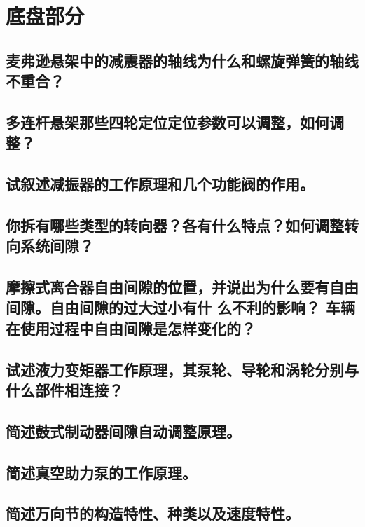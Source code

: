 \documentclass[UTF8]{ctexart}
\numberwithin{figure}{section}
\numberwithin{table}{section}
\begin{document}
\section{底盘部分}
\subsection{麦弗逊悬架中的减震器的轴线为什么和螺旋弹簧的轴线不重合？}
\subsection{多连杆悬架那些四轮定位定位参数可以调整，如何调整？}
\subsection{试叙述减振器的工作原理和几个功能阀的作用。}
\subsection{你拆有哪些类型的转向器？各有什么特点？如何调整转向系统间隙？}
\subsection{摩擦式离合器自由间隙的位置，并说出为什么要有自由间隙。自由间隙的过大过小有什
	么不利的影响？ 车辆在使用过程中自由间隙是怎样变化的？}
\subsection{试述液力变矩器工作原理，其泵轮、导轮和涡轮分别与什么部件相连接？}
\subsection{简述鼓式制动器间隙自动调整原理。}
\subsection{简述真空助力泵的工作原理。}
\subsection{简述万向节的构造特性、种类以及速度特性。}
\clearpage
\end{document}
